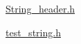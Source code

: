 \mbox{\hyperlink{_string__header_8h}{String\+\_\+header.\+h}}

\mbox{\hyperlink{test__string_8h}{test\+\_\+string.\+h}} 